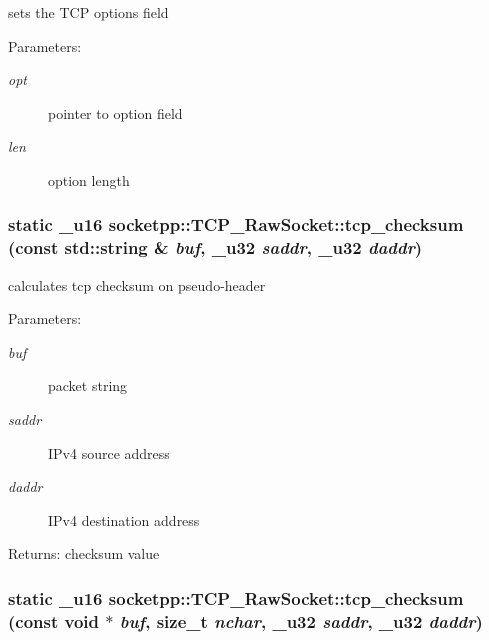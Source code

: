 sets the TCP options field 

\begin{Desc}
\item[Parameters:]
\begin{description}
\item[{\em opt}]pointer to option field \item[{\em len}]option length \end{description}
\end{Desc}
\hypertarget{classsocketpp_1_1TCP__RawSocket_1ac43948171803538577ca50dcd86402}{
\subsubsection[{tcp\_\-checksum}]{\setlength{\rightskip}{0pt plus 5cm}static \_\-u16 socketpp::TCP\_\-RawSocket::tcp\_\-checksum (const std::string \& {\em buf}, \/  \_\-u32 {\em saddr}, \/  \_\-u32 {\em daddr})}}
\label{classsocketpp_1_1TCP__RawSocket_1ac43948171803538577ca50dcd86402}


calculates tcp checksum on pseudo-header 

\begin{Desc}
\item[Parameters:]
\begin{description}
\item[{\em buf}]packet string \item[{\em saddr}]IPv4 source address \item[{\em daddr}]IPv4 destination address \end{description}
\end{Desc}
\begin{Desc}
\item[Returns:]checksum value \end{Desc}
\hypertarget{classsocketpp_1_1TCP__RawSocket_a0d080dc7c3318b854801d9d8887683c}{
\subsubsection[{tcp\_\-checksum}]{\setlength{\rightskip}{0pt plus 5cm}static \_\-u16 socketpp::TCP\_\-RawSocket::tcp\_\-checksum (const void $\ast$ {\em buf}, \/  size\_\-t {\em nchar}, \/  \_\-u32 {\em saddr}, \/  \_\-u32 {\em daddr})}}
\label{classsocketpp_1_1TCP__RawSocket_a0d080dc7c3318b854801d9d8887683c}


